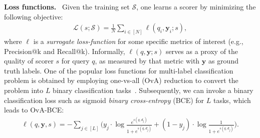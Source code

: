 \documentclass{article}
\begin{document}
\textbf{Loss functions.}~
Given the training set $\mathcal{S}$, one learns a scorer by minimizing the following objective: %
\begin{align}
\mathcal{L}(s; \mathcal{S}) = \frac{1}{N}\sum\nolimits_{i \in [N]} \ell(q_i,\mathbf{y}_i; s),
\end{align}
where $\ell$ is a \textit{surrogate loss-function} for some specific metrics of interest (e.g., Precision@k and Recall@k). Informally, $\ell(q, \mathbf{y}; s)$ serves as a proxy of the quality of scorer $s$ for query $q$, as measured by that metric with $\mathbf{y}$ as ground truth labels.
One of the popular loss functions for multi-label classification problem is obtained by employing one-vs-all (OvA) reduction to convert the problem into $L$ binary classification tasks~\citep{lapin2016topk}. Subsequently, we can invoke a binary classification loss such as sigmoid \textit{binary cross-entropy} (BCE) for $L$ tasks, which leads to OvA-BCE:
\begin{align}
\label{eq:bce-ova}
\ell(q, \mathbf{y}, s) =  - \sum\nolimits_{j \in [L]} \Big( y_j \cdot \log\frac{e^{s(q,d_j)}}{1 + e^{s(q,d_j)}} + (1- y_j) \cdot \log \frac{1}{1 + e^{s(q,d_j)}} \Big).
\end{align}
\end{document}
